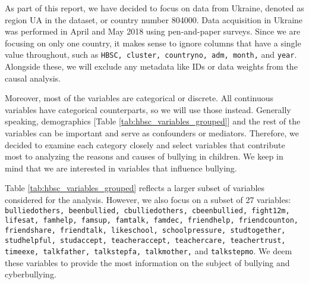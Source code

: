 \documentclass[main.tex]{subfiles}
\begin{document}



As part of this report, we have decided to focus on data from Ukraine, denoted as region UA in the dataset, or country number 804000. Data acquisition in Ukraine was performed in April and May 2018 using pen-and-paper surveys. Since we are focusing on only one country, it makes sense to ignore columns that have a single value throughout, such as \texttt{HBSC, cluster, countryno, adm, month,} and \texttt{year}. Alongside these, we will exclude any metadata like IDs or data weights from the causal analysis.

Moreover, most of the variables are categorical or discrete. All continuous variables have categorical counterparts, so we will use those instead. Generally speaking, demographics [Table \ref{tab:hbsc_variables_grouped}] and the rest of the variables can be important and serve as confounders or mediators. Therefore, we decided to examine each category closely and select variables that contribute most to analyzing the reasons and causes of bullying in children. We keep in mind that we are interested in variables that influence bullying.

Table \ref{tab:hbsc_variables_grouped} reflects a larger subset of variables considered for the analysis. However, we also focus on a subset of 27 variables: \texttt{bulliedothers, beenbullied, cbulliedothers, cbeenbullied, fight12m, lifesat, famhelp, famsup, famtalk, famdec, friendhelp, friendcounton, friendshare, friendtalk, likeschool, schoolpressure, studtogether, studhelpful, studaccept, teacheraccept, teachercare, teachertrust, timeexe, talkfather, talkstepfa, talkmother,} and \texttt{talkstepmo}. We deem these variables to provide the most information on the subject of bullying and cyberbullying.
\end{document}
